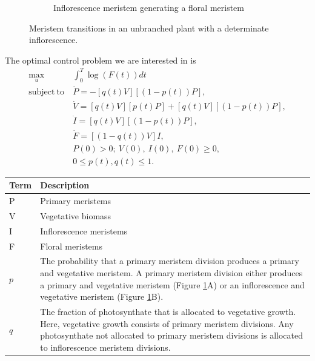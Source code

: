 \documentclass[12pt, oneside]{article}   	%
\begin{document}
\begin{figure}[hbt!]
\begin{subfigure}{.25\textwidth}
    \caption{Inflorescence meristem generating a floral meristem}
  \end{subfigure}
        \caption{Meristem transitions in an unbranched plant with a determinate inflorescence.}
    \label{fig:transitions-unbranched-determinate}
\end{figure}

The optimal control problem we are interested in is
%
\begin{align}
\max_{u} &  \int_0^T  \log( F(t) ) dt  \nonumber \\
\mathrm{subject\ to\ } 
& \dot{P} = - [q(t) V] [(1 - p(t)) P ] , \nonumber \\
& \dot{V} = [q(t) V] [ p(t) P]  + [q(t) V] [(1 - p(t)) P] , \nonumber \\ 
& \dot{I} = [q(t) V] [( 1-p(t) ) P], \nonumber \\ 
& \dot{F} = [(1-q(t)) V] I , \nonumber \\ 
& P(0) > 0;\ V(0),\ I(0),\ F(0) \geq 0, \nonumber \\
& 0 \leq p(t), q(t) \leq 1.  
\end{align}
%
\begin{table}[hbt!]
\footnotesize
\begin{tabularx}{\linewidth}{|l|X|}
\hline
\textbf{Term} & \textbf{Description} \\ \hline
 P    & Primary meristems            \\ \hline
 V   &  Vegetative biomass         \\ \hline
 I   &  Inflorescence meristems          \\ \hline
 F   &  Floral meristems          \\ \hline
 $p$  &  The probability that a primary meristem division produces a primary and vegetative meristem. A primary meristem division either produces a primary and vegetative meristem (Figure \ref{fig:transitions-unbranched-determinate}A) or an inflorescence and vegetative meristem (Figure \ref{fig:transitions-unbranched-determinate}B).      \\ \hline
 $q$   &  The fraction of photosynthate that is allocated to vegetative growth. Here, vegetative growth consists of primary meristem divisions. Any photosynthate not allocated to primary meristem divisions is allocated to inflorescence meristem divisions.         \\ \hline
\end{tabularx}
\end{table}
%
\end{document}
